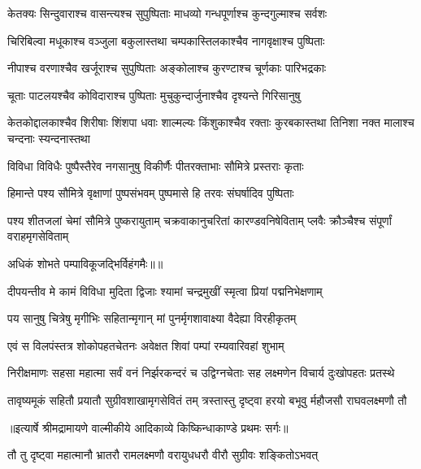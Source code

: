 \twolineshloka
{केतक्यः सिन्दुवाराश्च वासन्त्यश्च सुपुष्पिताः}
{माधव्यो गन्धपूर्णाश्च कुन्दगुल्माश्च सर्वशः} %

\twolineshloka
{चिरिबिल्वा मधूकाश्च वञ्जुला बकुलास्तथा}
{चम्पकास्तिलकाश्चैव नागवृक्षाश्च पुष्पिताः} %

\twolineshloka
{नीपाश्च वरणाश्चैव खर्जूराश्च सुपुष्पिताः}
{अङ्कोलाश्च कुरण्टाश्च चूर्णकाः पारिभद्रकाः} %

\twolineshloka
{चूताः पाटलयश्चैव कोविदाराश्च पुष्पिताः}
{मुचुकुन्दार्जुनाश्चैव दृश्यन्ते गिरिसानुषु} %

\threelineshloka
{केतकोद्दालकाश्चैव शिरीषाः शिंशपा धवाः}
{शाल्मल्यः किंशुकाश्चैव रक्ताः कुरबकास्तथा}
{तिनिशा नक्त मालाश्च चन्दनाः स्यन्दनास्तथा} %

\twolineshloka
{विविधा विविधैः पुष्पैस्तैरेव नगसानुषु}
{विकीर्णैः पीतरक्ताभाः सौमित्रे प्रस्तराः कृताः} %

\twolineshloka
{हिमान्ते पश्य सौमित्रे वृक्षाणां पुष्पसंभवम्}
{पुष्पमासे हि तरवः संघर्षादिव पुष्पिताः} %

\threelineshloka
{पश्य शीतजलां चेमां सौमित्रे पुष्करायुताम्}
{चक्रवाकानुचरितां कारण्डवनिषेविताम्}
{प्लवैः क्रौञ्चैश्च संपूर्णां वराहमृगसेविताम्} %

{अधिकं शोभते पम्पाविकूजद्भिर्विहंगमैः॥॥} %

\addtocounter{shlokacount}{1}

\twolineshloka
{दीपयन्तीव मे कामं विविधा मुदिता द्विजाः}
{श्यामां चन्द्रमुखीं स्मृत्वा प्रियां पद्मनिभेक्षणाम्} %

\twolineshloka
{पय सानुषु चित्रेषु मृगीभिः सहितान्मृगान्}
{मां पुनर्मृगशावाक्ष्या वैदेह्या विरहीकृतम्} %

\twolineshloka
{एवं स विलपंस्तत्र शोकोपहतचेतनः}
{अवेक्षत शिवां पम्पां रम्यवारिवहां शुभाम्} %

\fourlineindentedshloka
{निरीक्षमाणः सहसा महात्मा}
{ सर्वं वनं निर्झरकन्दरं च}
{उद्विग्नचेताः सह लक्ष्मणेन}
{ विचार्य दुःखोपहतः प्रतस्थे} %

\fourlineindentedshloka
{तावृष्यमूकं सहितौ प्रयातौ}
{ सुग्रीवशाखामृगसेवितं तम्}
{त्रस्तास्तु दृष्ट्वा हरयो बभूवु}
{र्महौजसौ राघवलक्ष्मणौ तौ} %


{॥इत्यार्षे श्रीमद्रामायणे वाल्मीकीये आदिकाव्ये किष्किन्धाकाण्डे प्रथमः सर्गः॥}


\twolineshloka
{तौ तु दृष्ट्वा महात्मानौ भ्रातरौ रामलक्ष्मणौ}
{वरायुधधरौ वीरौ सुग्रीवः शङ्कितोऽभवत्} %

